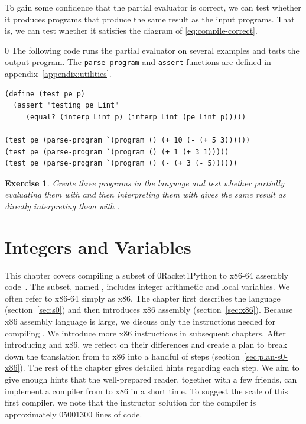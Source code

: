 \documentclass[7x10]{TimesAPriori_MIT}%
\def\racketEd{0}
\def\pythonEd{1}
\providecommand{\BookEdition}{1}
\let\edition\BookEdition
\newcommand{\racket}[1]{{\if\edition\racketEd{#1}\fi}}
\newcommand{\pythonColor}[0]{}
\newcommand{\python}[1]{{\if\edition\pythonEd\pythonColor #1\fi}}
\newtheorem{exercise}[theorem]{Exercise}
\numberwithin{theorem}{chapter}
\numberwithin{definition}{chapter}
\numberwithin{equation}{chapter}
\begin{document}
To gain some confidence that the partial evaluator is correct, we can
test whether it produces programs that produce the same result as the
input programs. That is, we can test whether it satisfies the diagram
of \eqref{eq:compile-correct}.
%
{\if\edition\racketEd
The following code runs the partial evaluator on several examples and
tests the output program.  The \texttt{parse-program} and
\texttt{assert} functions are defined in
appendix~\ref{appendix:utilities}.\\
\begin{minipage}{1.0\textwidth}
\begin{lstlisting}
(define (test_pe p)
  (assert "testing pe_Lint"
     (equal? (interp_Lint p) (interp_Lint (pe_Lint p)))))

(test_pe (parse-program `(program () (+ 10 (- (+ 5 3))))))
(test_pe (parse-program `(program () (+ 1 (+ 3 1)))))
(test_pe (parse-program `(program () (- (+ 3 (- 5))))))
\end{lstlisting}
\end{minipage}
\fi}

\begin{exercise}\normalfont\normalsize
  Create three programs in the \LangInt{} language and test whether
  partially evaluating them with  and then
  interpreting them with  gives the same result
  as directly interpreting them with .
\end{exercise}


\chapter{Integers and Variables}
\label{ch:Lvar}
\setcounter{footnote}{0}

This chapter covers compiling a subset of
\racket{Racket}\python{Python} to x86-64 assembly
code~\citep{Intel:2015aa}. The subset, named \LangVar{}, includes
integer arithmetic and local variables.  We often refer to x86-64
simply as x86.  The chapter first describes the \LangVar{} language
(section~\ref{sec:s0}) and then introduces x86 assembly
(section~\ref{sec:x86}). Because x86 assembly language is large, we
discuss only the instructions needed for compiling \LangVar{}. We
introduce more x86 instructions in subsequent chapters.  After
introducing \LangVar{} and x86, we reflect on their differences and
create a plan to break down the translation from \LangVar{} to x86
into a handful of steps (section~\ref{sec:plan-s0-x86}).  The rest of
the chapter gives detailed hints regarding each step.  We aim to give
enough hints that the well-prepared reader, together with a few
friends, can implement a compiler from \LangVar{} to x86 in a short
time.  To suggest the scale of this first compiler, we note that the
instructor solution for the \LangVar{} compiler is approximately
\racket{500}\python{300} lines of code.
\end{document}
